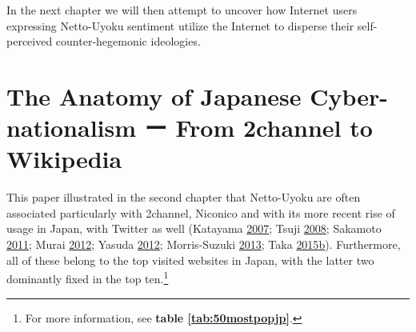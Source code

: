 \documentclass[10pt,british,A4paper,oneside]{memoir}
\begin{document}
In the next chapter we will then attempt to uncover how Internet users
expressing Netto-Uyoku sentiment utilize the Internet to disperse their
self-perceived counter-hegemonic ideologies.

\chapter{The Anatomy of Japanese Cyber-nationalism ー From 2channel to
Wikipedia}\label{the-anatomy-of-japanese-cyber-nationalism-ux30fc-from-2channel-to-wikipedia}

This paper illustrated in the second chapter that Netto-Uyoku are often
associated particularly with 2channel, Niconico and with its more recent
rise of usage in Japan, with Twitter as well (Katayama
\protect\hyperlink{ref-katayama_2-channel_2007}{2007}; Tsuji
\protect\hyperlink{ref-tsuji_eng:_2008}{2008}; Sakamoto
\protect\hyperlink{ref-sakamoto_koreans_2011}{2011}; Murai
\protect\hyperlink{ref-murai_net_2012}{2012}; Yasuda
\protect\hyperlink{ref-yasuda_eng:_2012}{2012}; Morris-Suzuki
\protect\hyperlink{ref-morris-suzuki_freedom_2013}{2013}; Taka
\protect\hyperlink{ref-taka_twitter_2015-1}{2015}\protect\hyperlink{ref-taka_twitter_2015-1}{b}).
Furthermore, all of these belong to the top visited websites in Japan,
with the latter two dominantly fixed in the top ten.\footnote{For more
  information, see \textbf{table \ref{tab:50mostpopjp}}.}
\end{document}

